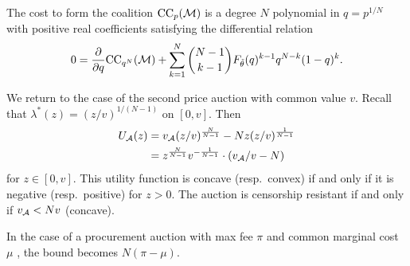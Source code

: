 \begin{theorem}

  The cost to form the coalition $\mathrm{CC}_{p}(\mathcal{M})$ is a degree $N$ polynomial in $q=p^{1/N}$ with positive real coefficients satisfying the differential relation
  \[
    0= \frac{\partial}{\partial q}\mathrm{CC}_{q^N}(\mathcal{M}) + \sum_{k=1}^N {N-1 \choose k-1} F_{\tilde\theta}(q)^{k-1} q^{N-k}(1-q)^k.
  \]

\end{theorem}


\begin{example}

  We return to the case of the second price auction with common value $v$.
  Recall that $\lambda^*(z)=(z/v)^{1/(N-1)}$ on $[0,v]$.
  Then 
  \begin{align*}
    U_{\mathcal{A}}(z) &= v_{\mathcal{A}} (z/v)^{\frac{N}{N-1}} - Nz(z/v)^{\frac{1}{N-1}} \\
    &= z^{\frac{N}{N-1}}v^{-\frac{1}{N-1}}\cdot \left(v_{\mathcal{A}}/v - N  \right)
  \end{align*}
  for $z\in[0,v]$.
  This utility function is concave (resp.~convex) if and only if it is negative (resp.~positive) for $z>0$.
  The auction is censorship resistant if and only if $v_{\mathcal{A}} < Nv$ (concave).

  In the case of a procurement auction with max fee $\pi$ and common marginal cost $\mu$ \cite[\S3.2]{roughgarden2024transaction}, the bound becomes $N(\pi-\mu)$.

\end{example}

